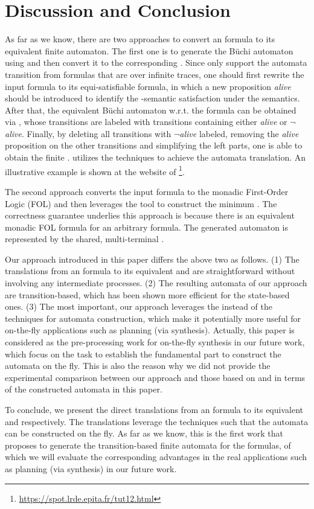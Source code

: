 \section{Discussion and Conclusion}\label{sec:discuss}
As far as we know, there are two approaches to convert an \ltlf formula to its equivalent finite automaton. The first one is to generate the B\"uchi automaton using \spot and then convert it to the corresponding \NFA. Since \spot only support the automata transition from \ltl formulas that are over infinite traces, one should first rewrite the input \ltlf formula to its equi-satisfiable \ltl formula, in which a new proposition \emph{alive} should be introduced to identify the \ltlf-semantic satisfaction under the \ltl semantics. After that, the equivalent B\"uchi automaton w.r.t. the \ltl formula can be obtained via \spot, whose transitions are labeled with transitions containing either \emph{alive} or \emph{$\neg$alive}. Finally, by deleting all transitions with \emph{$\neg$alive} labeled, removing the \emph{alive} proposition on the other transitions and simplifying the left parts, one is able to obtain the finite \NFA. \spot utilizes the \BDD techniques to achieve the automata translation. An illustrative example is shown at the website of \spot\footnote{\url{https://spot.lrde.epita.fr/tut12.html}}.

The second approach converts the input \ltlf formula to the monadic First-Order Logic (FOL) and then leverages the \mona tool \cite{EKM98} to construct the minimum \DFA \cite{ZTLPV17}. The correctness guarantee underlies this approach is because there is an equivalent monadic FOL formula for an arbitrary \ltlf formula. The generated automaton is represented by the shared, multi-terminal \BDD. 

Our approach introduced in this paper differs the above two as follows. (1) The translations from an \ltlf formula to its equivalent \TNFA and \TDFA are straightforward without involving any intermediate processes. (2) The resulting automata of our approach are transition-based, which has been shown more efficient for the state-based ones. (3) The most important, our approach leverages the \SAT instead of the \BDD techniques for automata construction, which make it potentially more useful for on-the-fly applications such as planning (via synthesis). Actually, this paper is considered as the pre-processing work for \ltlf on-the-fly synthesis in our future work, which focus on the task to establish the fundamental part to construct the automata on the fly. This is also the reason why we did not provide the experimental comparison between our approach and those based on \spot and \mona in terms of the constructed automata in this paper. 

To conclude, we present the direct translations from an \ltlf formula to its equivalent \TNFA and \TDFA respectively. The translations leverage the \SAT techniques such that the automata can be constructed on the fly. As far as we know, this is the first work that proposes to generate the transition-based finite automata for the \ltlf formulas, of which we will evaluate the corresponding advantages in the real applications such as planning (via synthesis) in our future work. 
